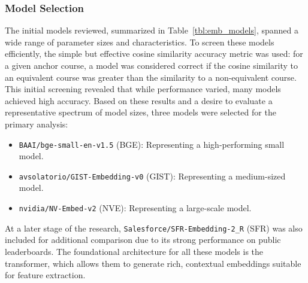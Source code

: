 \subsubsection{Model Selection}\label{ch:3.3.1.1}
The initial models reviewed, summarized in Table~\ref{tbl:emb_models}, spanned a wide range of parameter sizes and characteristics. To screen these models efficiently, the simple but effective cosine similarity accuracy metric was used: for a given anchor course, a model was considered correct if the cosine similarity to an equivalent course was greater than the similarity to a non-equivalent course. This initial screening revealed that while performance varied, many models achieved high accuracy. Based on these results and a desire to evaluate a representative spectrum of model sizes, three models were selected for the primary analysis:
\begin{itemize}
    \item \verb|BAAI/bge-small-en-v1.5| (BGE): Representing a high-performing small model.
    \item \verb|avsolatorio/GIST-Embedding-v0| (GIST): Representing a medium-sized model.
    \item \verb|nvidia/NV-Embed-v2| (NVE): Representing a large-scale model.
\end{itemize}
At a later stage of the research, \verb|Salesforce/SFR-Embedding-2_R| (SFR) was also included for additional comparison due to its strong performance on public leaderboards. The foundational architecture for all these models is the transformer, which allows them to generate rich, contextual embeddings suitable for feature extraction.

